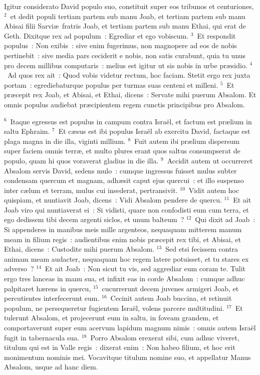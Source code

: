\lettrine[lines=3,image=true,loversize=0.05,lraise=-0.03]{I}{}gitur considerato David populo suo, constituit super eos tribunos et centuriones,
${}^{2}$~et dedit populi tertiam partem sub manu Joab, et tertiam partem sub manu Abisai filii Sarvi\ae\ fratris Joab, et tertiam partem sub manu Ethai, qui erat de Geth. Dixitque rex ad populum~: Egrediar et ego vobiscum.
${}^{3}$~Et respondit populus~: Non exibis~: sive enim fugerimus, non magnopere ad eos de nobis pertinebit~: sive media pars ceciderit e nobis, non satis curabunt, quia tu unus pro decem millibus computaris~: melius est igitur ut sis nobis in urbe pr\ae sidio.
${}^{4}$~Ad quos rex ait~: Quod vobis videtur rectum, hoc faciam. Stetit ergo rex juxta portam~: egrediebaturque populus per turmas suas centeni et milleni.
${}^{5}$~Et pr\ae cepit rex Joab, et Abisai, et Ethai, dicens~: Servate mihi puerum Absalom. Et omnis populus audiebat pr\ae cipientem regem cunctis principibus pro Absalom.


${}^{6}$~Itaque egressus est populus in campum contra Isra\"el, et factum est pr\ae lium in saltu Ephraim.
${}^{7}$~Et c\ae sus est ibi populus Isra\"el ab exercitu David, factaque est plaga magna in die illa, viginti millium.
${}^{8}$~Fuit autem ibi pr\ae lium dispersum super faciem omnis terr\ae , et multo plures erant quos saltus consumpserat de populo, quam hi quos voraverat gladius in die illa.
${}^{9}$~Accidit autem ut occurreret Absalom servis David, sedens mulo~: cumque ingressus fuisset mulus subter condensam quercum et magnam, adh\ae sit caput ejus quercui~: et illo suspenso inter c\ae lum et terram, mulus cui insederat, pertransivit.
${}^{10}$~Vidit autem hoc quispiam, et nuntiavit Joab, dicens~: Vidi Absalom pendere de quercu.
${}^{11}$~Et ait Joab viro qui nuntiaverat ei~: Si vidisti, quare non confodisti eum cum terra, et ego dedissem tibi decem argenti siclos, et unum balteum~?
${}^{12}$~Qui dixit ad Joab~: Si appenderes in manibus meis mille argenteos, nequaquam mitterem manum meam in filium regis~: audientibus enim nobis pr\ae cepit rex tibi, et Abisai, et Ethai, dicens~: Custodite mihi puerum Absalom.
${}^{13}$~Sed etsi fecissem contra animam meam audacter, nequaquam hoc regem latere potuisset, et tu stares ex adverso~?
${}^{14}$~Et ait Joab~: Non sicut tu vis, sed aggrediar eum coram te. Tulit ergo tres lanceas in manu sua, et infixit eas in corde Absalom~: cumque adhuc palpitaret h\ae rens in quercu,
${}^{15}$~cucurrerunt decem juvenes armigeri Joab, et percutientes interfecerunt eum.
${}^{16}$~Cecinit autem Joab buccina, et retinuit populum, ne persequeretur fugientem Isra\"el, volens parcere multitudini.
${}^{17}$~Et tulerunt Absalom, et projecerunt eum in saltu, in foveam grandem, et comportaverunt super eum acervum lapidum magnum nimis~: omnis autem Isra\"el fugit in tabernacula sua.
${}^{18}$~Porro Absalom erexerat sibi, cum adhuc viveret, titulum qui est in Valle regis~: dixerat enim~: Non habeo filium, et hoc erit monimentum nominis mei. Vocavitque titulum nomine suo, et appellatur Manus Absalom, usque ad hanc diem.


